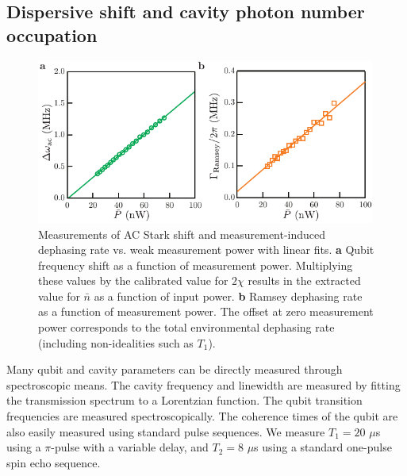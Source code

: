 \subsection{Dispersive shift and cavity photon number occupation}\label{s:chi_cal}

\begin{figure}
\begin{center}
	\includegraphics[width = 4.39in]{qfb_exp_chapter/chi_cal}
\end{center}
\caption[AC Stark shift and dephasing rate]{Measurements of AC Stark shift and measurement-induced dephasing rate vs. weak measurement power with linear fits.  \textbf{a} Qubit frequency shift as a function of measurement power.  Multiplying these values by the calibrated value for $2\chi$ results in the extracted value for $\bar{n}$ as a function of input power.  \textbf{b} Ramsey dephasing rate as a function of measurement power.  The offset at zero measurement power corresponds to the total environmental dephasing rate (including non-idealities such as $T_1$).}
\label{fig:chi_cal}
\end{figure}

Many qubit and cavity parameters can be directly measured through spectroscopic means.  The cavity frequency and linewidth are measured by fitting the transmission spectrum to a Lorentzian function.  The qubit transition frequencies are measured spectroscopically.  The coherence times of the qubit are also easily measured using standard pulse sequences.  We measure $T_1 = 20$ $\mu$s using a $\pi$-pulse with a variable delay, and $T_2 = 8$ $\mu$s using a standard one-pulse spin echo sequence.

